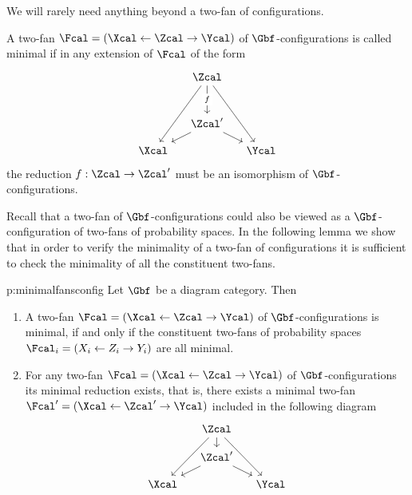   We will rarely need anything beyond a two-fan of configurations.

  A two-fan $\Fcal=(\Xcal\ot\Zcal\to\Ycal)$ of
  $\Gbf$-configurations is called minimal if in any extension of
  $\Fcal$ of the form
  \[
  \begin{tikzcd}[ row sep=small, column sep=small,ampersand replacement=\&]
    \mbox{}
    \&
    \Zcal
    \arrow{dd}[description]{f}
    \arrow{dddl}{}
    \arrow{dddr}{}
    \&
    \mbox{}
    \\
    \mbox{}
    \&
    \&
    \\
    \mbox{}
    \&
    \Zcal'
    \arrow{dr}{}
    \arrow{dl}{}
    \&
    \mbox{}
    \\
    \Xcal
    \&
    \&
    \Ycal
  \end{tikzcd}
  \]
  the reduction $f:\Zcal\to\Zcal'$ must be an isomorphism of
  $\Gbf$-configurations.

  Recall that a two-fan of $\Gbf$-configurations could also be viewed
  as a $\Gbf$-configuration of two-fans of probability spaces. In the
  following lemma we show that in order to verify the minimality of a
  two-fan of configurations it is sufficient to check the minimality
  of all the constituent two-fans.
  \begin{lemma}{p:minimalfansconfig}
    Let $\Gbf$ be a diagram category. Then
    \begin{enumerate}
    \item\label{p:minimalfansconfig1} A two-fan
      $\Fcal=(\Xcal\ot\Zcal\to\Ycal)$ of $\Gbf$-configurations is
      minimal, if and only if the constituent two-fans of probability
      spaces $\Fcal_{i}=(X_{i}\ot Z_{i}\to Y_{i})$ are all minimal.
    \item \label{p:minimalfansconfig2}
      For any two-fan $\Fcal=(\Xcal\ot\Zcal\to\Ycal)$ of
      $\Gbf$-configurations its minimal reduction exists,
      that is, there exists a minimal two-fan
      $\Fcal'=(\Xcal\ot\Zcal'\to\Ycal)$ included in the following
      diagram
      \[
      \begin{tikzcd}[row sep=small, column sep=small, ampersand replacement=\&]
        \mbox{}
        \&
        \Zcal
        \arrow{d}{}
        \arrow{ddl}{}
        \arrow{ddr}{}
        \&
        \mbox{}
        \\
        \mbox{}
        \&
        \Zcal'
        \arrow{dr}{}
        \arrow{dl}{}
        \&
        \mbox{}
        \\
        \Xcal
        \&
        \&
        \Ycal
      \end{tikzcd}
      \]      
    \end{enumerate}
  \end{lemma}

